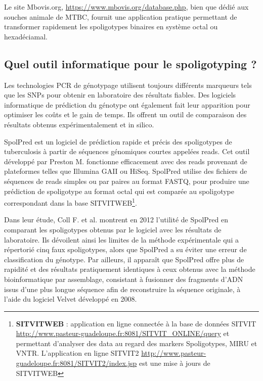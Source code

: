 \documentclass[twoside,a4paper,11pt,frenchb,openany]{report}
\begin{document}
Le site Mbovis.org, \url{https://www.mbovis.org/database.php}, bien que dédié aux souches animale de MTBC, fournit une application pratique permettant de transformer rapidement les spoligotypes binaires en système octal ou hexadéciamal.


\subsection{Quel outil informatique pour le spoligotyping ?}

Les technologies PCR de génotypage utilisent toujours différents marqueurs tels que les SNPs pour obtenir en laboratoire des résultats fiables. Des logiciels informatique de prédiction du génotype ont également fait leur apparition pour optimiser les coûts et le gain de temps. Ils offrent un outil de comparaison des résultats obtenus expérimentalement et in silico.

SpolPred est un logiciel de prédiction rapide et précis des spoligotypes de tuberculosis à partir de séquences génomiques courtes appelées reads. Cet outil développé par Preston M. fonctionne efficacement avec des reads provenant de plateformes telles que Illumina GAII ou HiSeq. SpolPred utilise des fichiers de séquences de reads simples ou par paires au format FASTQ, pour produire une prédiction de spoligotype au format octal qui est comparée au spoligotype correspondant dans la base SITVITWEB\footnote{\textbf{SITVITWEB} : application en ligne connectée à la base de données SITVIT \url{http://www.pasteur-guadeloupe.fr:8081/SITVIT_ONLINE/query} et permettant d'analyser des data au regard des markers Spoligotypes, MIRU et VNTR. L'application en ligne SITVIT2 \url{http://www.pasteur-guadeloupe.fr:8081/SITVIT2/index.jsp} est une mise à jours de SITVITWEB}.

Dans leur étude, Coll F. et al.\cite{coll} montrent en 2012 l'utilité de SpolPred en comparant les spoligotypes obtenus par le logiciel avec les résultats de laboratoire. Ils dévoilent ainsi les limites de la méthode expérimentale qui a répertorié cinq faux spoligotypes, alors que SpolPred a su éviter une erreur de classification du génotype. Par ailleurs, il apparaît que SpolPred offre plus de rapidité et des résultats pratiquement identiques à ceux obtenus avec la méthode bioinformatique par assemblage, consistant à fusionner des fragments d'ADN issus d'une plus longue séquence afin de reconstruire la séquence originale, à l'aide du logiciel Velvet développé en 2008.
\end{document}
